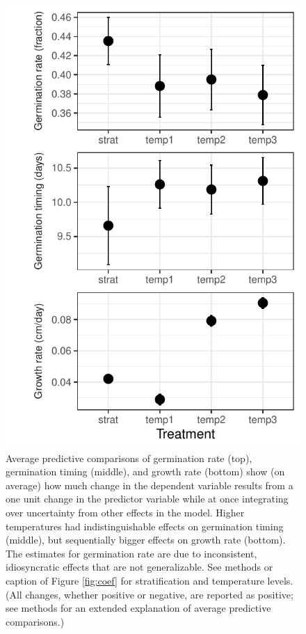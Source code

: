 \documentclass[12pt]{article}\usepackage[]{graphicx}\usepackage[]{color}
\begin{document}
\begin{figure}
	\begin{center}
	\includegraphics[scale=1]{apc_fig.pdf}
	\caption{Average predictive comparisons of germination rate (top), germination timing (middle), and growth rate (bottom) show (on average) how much change in the dependent variable results from a one unit change in the predictor variable while at once integrating over uncertainty from other effects in the model. Higher temperatures had indistinguishable effects on germination timing (middle), but sequentially bigger effects on growth rate (bottom). The estimates for germination rate are due to inconsistent, idiosyncratic effects that are not generalizable. See methods or caption of Figure \ref{fig:coef} for stratification and temperature levels. (All changes, whether positive or negative, are reported as positive; see methods for an extended explanation of average predictive comparisons.)}
\label{fig:apc}
\end{center}
\end{figure}
\end{document}
